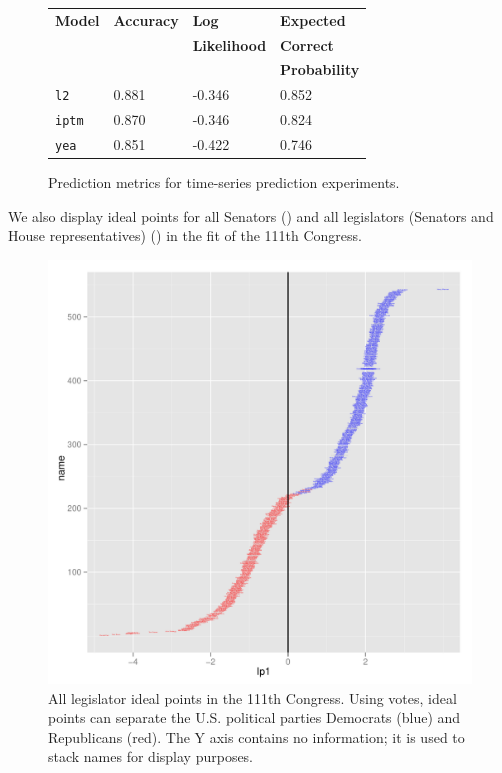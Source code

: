 \begin{figure}
  \center
  \begin{tabular}{|l|l|l|l|}
    \hline
    \textbf{Model} & \textbf{Accuracy} & \textbf{Log} & \textbf{Expected} \\
    & & \textbf{Likelihood} & \textbf{Correct} \\
    & & & \textbf{Probability} \\
    \hline
    \verb!l2! & 0.881 & -0.346 & 0.852 \\
    \hline
    \verb!iptm! & 0.870 & -0.346 & 0.824 \\
    \hline
    \verb!yea! & 0.851 & -0.422 & 0.746 \\
    \hline
  \end{tabular}
  \caption{Prediction metrics for time-series prediction experiments.}
  \label{fig:prediction_stats}
\end{figure}

We also display ideal points for all Senators () and all legislators (Senators and House representatives) () in the fit of the 111th Congress.

\begin{figure}[t]
  \center
  \includegraphics[width=1.\textwidth]
  {chapter_predicting_votes_with_text/figures/134_legislator_name_accuracy_by_ip.pdf}
  \caption{All legislator ideal points in the 111th Congress.  Using
    votes, ideal points can separate the U.S. political parties
    Democrats (blue) and Republicans (red).  The Y axis contains no
    information; it is used to stack names for display purposes.}
\label{fig:all_ideal_points}
\end{figure}

